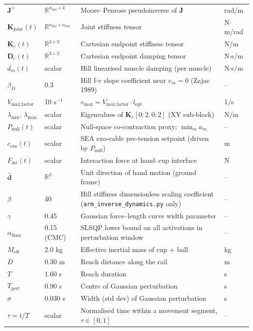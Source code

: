 \documentclass[11pt,a4paper]{article}
\newcommand{\file}[1]{\texttt{\color{PipePurple}#1}}
\newcommand{\R}{\mathbb{R}}
\newcommand{\bK}{\bm{K}}
\newcommand{\bJ}{\bm{J}}
\begin{document}
\begin{center}
\begin{tabular}{llll}
$\bJ^+$ & $\R^{n_\text{dof}\times3}$ & Moore--Penrose pseudoinverse of $\bJ$ & rad/m \\
\rowcolor{LightBlue}
$\bK_\text{joint}(t)$ & $\R^{n_\text{dof}\times n_\text{dof}}$ & Joint stiffness tensor & N$\cdot$m/rad \\
$\bm{K}_e(t)$ & $\R^{3\times3}$ & Cartesian endpoint stiffness tensor & N/m \\
\rowcolor{LightBlue}
$\bm{D}_e(t)$ & $\R^{3\times3}$ & Cartesian endpoint damping tensor & N$\cdot$s/m \\
$d_m(t)$ & scalar & Hill linearised muscle damping (per muscle) & N$\cdot$s/m \\
\rowcolor{LightBlue}
$\beta_D$ & 0.3 & Hill f-v slope coefficient near $v_m=0$ (Zajac 1989) & -- \\
$V_\text{max,factor}$ & 10 s$^{-1}$ & $v_\text{max}=V_\text{max,factor}\cdot l_\text{opt}$ & 1/s \\
\rowcolor{LightBlue}
$\lambda_{\min},\,\lambda_{\max}$ & scalar & Eigenvalues of $\bm{K}_e[0:2,0:2]$ (XY sub-block) & N/m \\
$P_\text{null}(t)$ & scalar & Null-space co-contraction proxy: $\min_m a_m$ & -- \\
\rowcolor{LightBlue}
$c_\text{exo}(t)$ & scalar & SEA exo-cable pre-tension setpoint (driven by $P_\text{null}$) & m \\
$F_\text{int}(t)$ & scalar & Interaction force at hand--cup interface & N \\
\rowcolor{LightBlue}
$\hat{\bm{d}}$ & $\R^3$ & Unit direction of hand motion (ground frame) & -- \\
$\beta$ & 40 & Hill stiffness dimensionless scaling coefficient (\file{arm\_inverse\_dynamics.py} only) & -- \\
\rowcolor{LightBlue}
$\gamma$ & 0.45 & Gaussian force--length curve width parameter & -- \\
$\alpha_\text{floor}$ & 0.15 (CMC) & SLSQP lower bound on all activations in perturbation window & -- \\
\rowcolor{LightBlue}
$M_\text{eff}$ & 2.0 kg & Effective inertial mass of cup + ball & kg \\
$D$ & 0.30 m & Reach distance along the rail & m \\
\rowcolor{LightBlue}
$T$ & 1.60 s & Reach duration & s \\
$T_\text{pert}$ & 0.90 s & Centre of Gaussian perturbation & s \\
\rowcolor{LightBlue}
$\sigma$ & 0.030 s & Width (std dev) of Gaussian perturbation & s \\
$\tau = t/T$ & scalar & Normalised time within a movement segment, $\tau\in[0,1]$ & -- \\
\bottomrule
\end{tabular}
\end{center}
\end{document}
